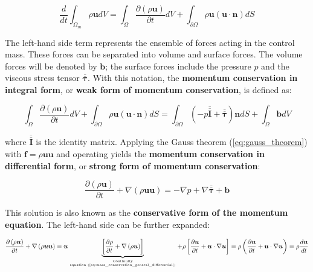 \begin{equation}
\frac{d}{dt} \int_{\Omega_m} \rho \boldsymbol{u}  dV =  \int_\Omega \frac{\partial \left( \rho \boldsymbol{u} \right) }{\partial t} dV + \int_{\partial \Omega} \rho \boldsymbol{u} \left( \boldsymbol{u} \cdot \boldsymbol{n} \right) dS
\end{equation}

The left-hand side term represents the ensemble of forces acting in the control mass. These forces can be separated into volume and surface forces. The volume forces will be denoted by $\boldsymbol{b}$; the surface forces include the pressure $p$ and the viscous stress tensor $\overline{\overline{\pmb{\tau}}}$. With this notation, the \textbf{momentum conservation in integral form}, or \textbf{weak form of momentum conservation}, is defined as:

\begin{equation}
\label{eq:momentum_conservation_general_integral}
\boxed{
\int_\Omega \frac{\partial \left( \rho \boldsymbol{u} \right) }{\partial t} dV + \int_{\partial \Omega} \rho \boldsymbol{u} \left( \boldsymbol{u} \cdot \boldsymbol{n} \right) dS =  \int_{\partial \Omega} \left( - p \overline{\overline{\pmb{I}}} + \overline{\overline{\pmb{\tau}}} \right) \boldsymbol{n} dS + \int_\Omega \boldsymbol{b} dV
}
\end{equation}

where $\overline{\overline{\pmb{I}}}$ is the identity matrix. Applying the Gauss theorem (\ref{eq:gauss_theorem}) with $\boldsymbol{f} = \rho \boldsymbol{u} \boldsymbol{u}$ and operating yields the \textbf{momentum conservation in differential form}, or \textbf{strong form of momentum conservation}:

\begin{equation}
\label{eq:momentum_conservation_general_differential}
\boxed{
\frac{\partial \left( \rho \boldsymbol{u} \right) }{\partial t}  + \nabla \left( \rho \boldsymbol{u}  \boldsymbol{u} \right) =  - \nabla p + \nabla \overline{\overline{\pmb{\tau}}} + \boldsymbol{b} 
}
\end{equation}

This solution is also known as the \textbf{conservative form of the momentum equation}. The left-hand side can be further expanded:

\begin{equation}
\frac{\partial \left( \rho \boldsymbol{u} \right) }{\partial t}  + \nabla \left( \rho \boldsymbol{u}  \boldsymbol{u} \right) =  \boldsymbol{u} \underbrace{ \left[ \frac{\partial \rho}{\partial t} +  \nabla \left( \rho \boldsymbol{u} \right) \right]}_{\text{Continuity}\atop\text{equation (\ref{eq:mass_conservation_general_differential})}}  + \rho \left[ \frac{\partial \boldsymbol{u}}{\partial t} +  \boldsymbol{u} \cdot \nabla \boldsymbol{u} \right] = \rho \left( \frac{\partial \boldsymbol{u}}{\partial t} +  \boldsymbol{u} \cdot \nabla \boldsymbol{u} \right) = \rho \frac{d \boldsymbol{u}}{dt}
\end{equation}

